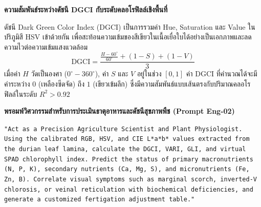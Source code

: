 \begin{theorybox}
\textbf{ความสัมพันธ์ระหว่างดัชนี DGCI กับระดับคลอโรฟิลล์เชิงพื้นที่}\par
ดัชนี Dark Green Color Index (DGCI) เป็นการรวมค่า Hue, Saturation และ Value ในปริภูมิสี HSV เข้าด้วยกัน เพื่อสะท้อนความเข้มของสีเขียวในเนื้อเยื่อใบได้อย่างเป็นเอกภาพและลดความไวต่อความเข้มแสงแวดล้อม
\begin{equation}
  \text{DGCI} = \frac{\frac{H - 60^\circ}{60^\circ} + (1 - S) + (1 - V)}{3}
\end{equation}
เมื่อค่า $H$ วัดเป็นองศา ($0^\circ - 360^\circ$), ค่า $S$ และ $V$ อยู่ในช่วง $[0, 1]$ ค่า DGCI ที่คำนวณได้จะมีค่าระหว่าง $0$ (เหลืองซีดจัด) ถึง $1$ (เขียวเข้มลึก) ซึ่งมีความสัมพันธ์แบบเส้นตรงกับปริมาณคลอโรฟิลล์ในระดับ $R^2 > 0.92$
\end{theorybox}

\begin{promptbox}
\textbf{พรอมพ์วิศวกรรมสำหรับการประเมินธาตุอาหารและดัชนีสุขภาพพืช (Prompt Eng-02)}\par
\texttt{"Act as a Precision Agriculture Scientist and Plant Physiologist. Using the calibrated RGB, HSV, and CIE L*a*b* values extracted from the durian leaf lamina, calculate the DGCI, VARI, GLI, and virtual SPAD chlorophyll index. Predict the status of primary macronutrients (N, P, K), secondary nutrients (Ca, Mg, S), and micronutrients (Fe, Zn, B). Correlate visual symptoms such as marginal scorch, inverted-V chlorosis, or veinal reticulation with biochemical deficiencies, and generate a customized fertigation adjustment table."}
\end{promptbox}
